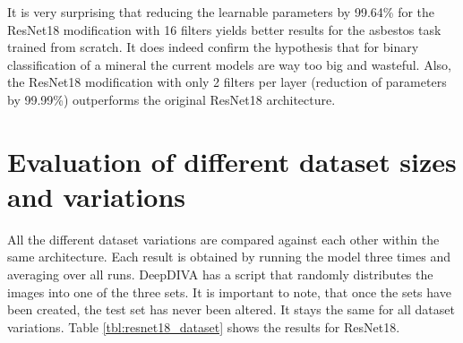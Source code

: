 \begin{table}[!h] \centering
{}
\caption{Resnet18 with different number of filters on the FINAL dataset. The number of filters present in paranthesis is the number of filters used per layer.}
\label{tbl:resnet18-different-filters}
\end{table}

It is very surprising that reducing the learnable parameters by 99.64\% for the ResNet18 modification with 16 filters yields better results for the asbestos task trained from scratch. It does indeed confirm the hypothesis that for binary classification of a mineral the current models are way too big and wasteful. Also, the ResNet18 modification with only 2 filters per layer (reduction of parameters by 99.99\%) outperforms the original ResNet18 architecture.






\section{Evaluation of different dataset sizes and variations}

All the different dataset variations are compared against each other within the same architecture. Each result is obtained by running the model three times and averaging over all runs. DeepDIVA has a script that randomly distributes the images into one of the three sets. It is important to note, that once the sets have been created, the test set has never been altered. It stays the same for all dataset variations. Table \ref{tbl:resnet18_dataset} shows the results for ResNet18. \\

